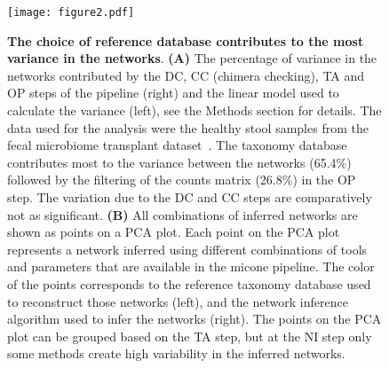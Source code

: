   \begin{figure}[H]
    \centering
    \texttt{[image: figure2.pdf]}
  \end{figure}
  \begin{figure}[H]
    \centering
      \caption{
      \textbf{The choice of reference database contributes to the most variance in the networks}.
      \textbf{(A)} The percentage of variance in the networks contributed by the DC, CC (chimera checking), TA and OP steps of the pipeline (right) and the linear model used to calculate the variance (left), see the Methods section for details.
      The data used for the analysis were the healthy stool samples from the fecal microbiome transplant dataset~\cite{Kang2017}.
      The taxonomy database contributes most to the variance between the networks (65.4\%) followed by the filtering of the counts matrix (26.8\%) in the OP step.
      The variation due to the DC and CC steps are comparatively not as significant.
      \textbf{(B)} All combinations of inferred networks are shown as points on a PCA plot.
      Each point on the PCA plot represents a network inferred using different combinations of tools and parameters that are available in the \ac{micone} pipeline.
      The color of the points corresponds to the reference taxonomy database used to reconstruct those networks (left), and the network inference algorithm used to infer the networks (right).
      The points on the PCA plot can be grouped based on the TA step, but at the NI step only some methods create high variability in the inferred networks.
    }
    \label{fig:figure2}
  \end{figure}
  \FloatBarrier
  \newpage

